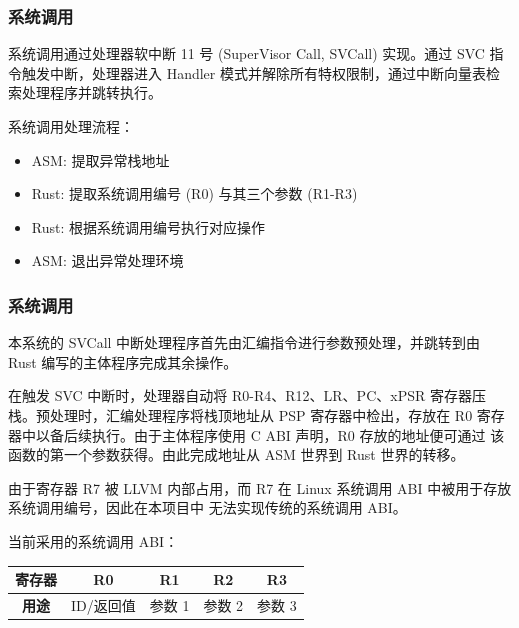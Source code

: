 \documentclass[aspectratio=169]{ctexbeamer}
\begin{document}
\begin{frame}

    \frametitle{系统调用}

    系统调用通过处理器软中断 11 号 (SuperVisor Call, SVCall) 实现。通过 SVC 指令触发中断，处理器进入 
    Handler 模式并解除所有特权限制，通过中断向量表检索处理程序并跳转执行。

    \par

    系统调用处理流程：
    
    \begin{itemize}
        \item ASM: 提取异常栈地址
        \item Rust: 提取系统调用编号 (R0) 与其三个参数 (R1-R3)
        \item Rust: 根据系统调用编号执行对应操作
        \item ASM: 退出异常处理环境
    \end{itemize}

\end{frame}

\begin{frame}

    \frametitle{系统调用}

    \par

    本系统的 SVCall 中断处理程序首先由汇编指令进行参数预处理，并跳转到由 Rust 编写的主体程序完成其余操作。

    \par

    在触发 SVC 中断时，处理器自动将 R0-R4、R12、LR、PC、xPSR 寄存器压栈。预处理时，汇编处理程序将栈顶地址从
    PSP 寄存器中检出，存放在 R0 寄存器中以备后续执行。由于主体程序使用 C ABI 声明，R0 存放的地址便可通过
    该函数的第一个参数获得。由此完成地址从 ASM 世界到 Rust 世界的转移。

    \par

    由于寄存器 R7 被 LLVM 内部占用，而 R7 在 Linux 系统调用 ABI 中被用于存放系统调用编号，因此在本项目中
    无法实现传统的系统调用 ABI。

    \par

    当前采用的系统调用 ABI：

    \begin{center}
        \begin{tabular}{ |c|c|c|c|c| }
            \hline
            \textbf{寄存器} & R0 & R1 & R2 & R3 \\ \hline
            \textbf{用途} & ID/返回值 & 参数 1 & 参数 2 & 参数 3 \\
            \hline
        \end{tabular}
    \end{center}
    
\end{frame}
\end{document}

